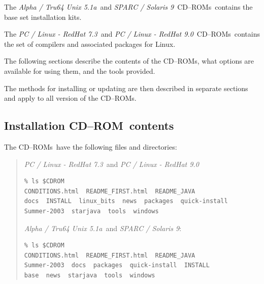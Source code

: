 \documentclass[twoside,11pt]{article}
\newcommand{\xlabel}[1]{}
\renewcommand{\_}{\texttt{\symbol{95}}}
\newcommand{\cdrom}{CD--ROM}
\newcommand{\cdrom}{CD-ROM}
\newcommand{\cdroms}{CD--ROMs}
\newcommand{\cdroms}{CD-ROMs}
\newcommand{\axp}{\textit{Alpha / Tru64 Unix 5.1a}}
\newcommand{\rha}{\textit{PC / Linux - RedHat 7.3}}
\newcommand{\rhb}{\textit{PC / Linux - RedHat 9.0}}
\newcommand{\sol}{\textit{SPARC / Solaris 9}}
\begin{document}
The \axp\ and \sol\ \cdroms\ contains the base set installation kits.

The \rha\ and \rhb\ \cdroms\ contains the set of compilers and associated
packages for Linux.

The following sections describe the contents of the \cdroms, what
options are available for using them, and the tools provided.

The methods for installing or updating are then described in separate
sections and apply to all version of the \cdroms.

\subsection{\xlabel{installation_cdrom_contents}Installation \cdrom\ contents}
\label{installation_cdrom_contents}

The \cdroms\ have the following files and directories:

\begin{quote}
\rha\ and \rhb
\begin{verbatim}
% ls $CDROM
CONDITIONS.html  README_FIRST.html  README_JAVA
docs  INSTALL  linux_bits  news  packages  quick-install
Summer-2003  starjava  tools  windows
\end{verbatim}
\axp\ and \sol:
\begin{verbatim}
% ls $CDROM
CONDITIONS.html  README_FIRST.html  README_JAVA
Summer-2003  docs  packages  quick-install  INSTALL
base  news  starjava  tools  windows
\end{verbatim}
\end{quote}
\end{document}

